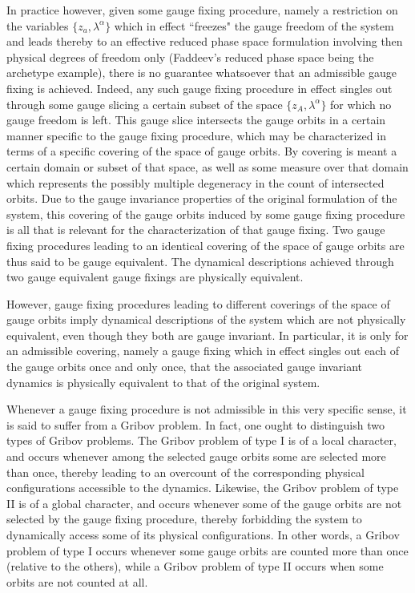 \documentclass[a4paper,11pt]{article}
\begin{document}
In practice however, given some gauge fixing procedure, namely a restriction
on the variables $\{z_a,\lambda^\alpha\}$ which in effect ``freezes" the
gauge freedom of the system and leads thereby to an effective reduced
phase space formulation involving then physical degrees of freedom only
(Faddeev's reduced phase space being the archetype example), there is no
guarantee whatsoever that an admissible gauge fixing is achieved.
Indeed, any such gauge fixing procedure in effect singles out through some
gauge slicing a certain subset of the space $\{z_A,\lambda^\alpha\}$
for which no gauge freedom is left. This gauge slice intersects the
gauge orbits in a certain manner specific to the gauge fixing procedure,
which may be characterized in terms of a specific covering of the space
of gauge orbits.\cite{JG1} By covering is meant a certain domain or subset 
of that space, as well as some measure over that domain which represents the
possibly multiple degeneracy in the count of intersected orbits.
Due to the gauge invariance properties of the original formulation of
the system, this covering of the gauge orbits induced by some gauge
fixing procedure is all that is relevant for the characterization of
that gauge fixing. Two gauge fixing procedures leading to an identical
covering of the space of gauge orbits are thus said to be gauge equivalent.
The dynamical descriptions achieved through two gauge equivalent gauge
fixings are physically equivalent.

\vspace{5pt}

However, gauge fixing procedures leading to different coverings of the
space of gauge orbits imply dynamical descriptions of the system which
are not physically equivalent, even though they both are gauge invariant.
In particular, it is only for an admissible covering, namely a gauge
fixing which in effect singles out each of the gauge orbits once and only
once, that the associated gauge invariant dynamics is physically
equivalent to that of the original system.

Whenever a gauge fixing procedure is not admissible in this very specific
sense, it is said to suffer from a Gribov problem.\cite{Gribov} In fact, 
one ought to distinguish two types of Gribov problems.\cite{JG1} 
The Gribov problem of type I
is of a local character, and occurs whenever among the selected gauge orbits
some are selected more than once, thereby leading to an overcount of
the cor\-res\-pon\-ding physical configurations accessible to the dynamics.
Likewise, the Gribov problem of type II is of a global character, and
occurs whenever some of the gauge orbits are not selected by the gauge fixing
procedure, thereby forbidding the system to dynamically access some of its
physical configurations. In other words, a Gribov problem of type I occurs
whenever some gauge orbits are counted more than once (relative to the
others), while a Gribov problem of type II occurs when some orbits are
not counted at all. 
\end{document}
